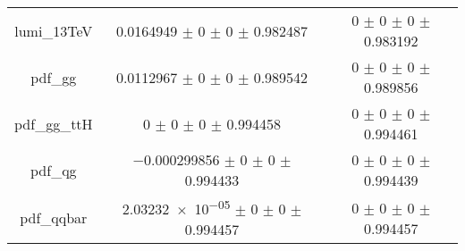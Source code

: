 \begin{table}
\begin{tabular}{ccc}
lumi\_13TeV & \num{0.0164949} $\pm$ \num{0} $\pm$ \num{0} $\pm$ \num{0.982487} & \num{0} $\pm$ \num{0} $\pm$ \num{0} $\pm$ \num{0.983192}\\
pdf\_gg & \num{0.0112967} $\pm$ \num{0} $\pm$ \num{0} $\pm$ \num{0.989542} & \num{0} $\pm$ \num{0} $\pm$ \num{0} $\pm$ \num{0.989856}\\
pdf\_gg\_ttH & \num{0} $\pm$ \num{0} $\pm$ \num{0} $\pm$ \num{0.994458} & \num{0} $\pm$ \num{0} $\pm$ \num{0} $\pm$ \num{0.994461}\\
pdf\_qg & \num{-0.000299856} $\pm$ \num{0} $\pm$ \num{0} $\pm$ \num{0.994433} & \num{0} $\pm$ \num{0} $\pm$ \num{0} $\pm$ \num{0.994439}\\
pdf\_qqbar & \num{2.03232e-05} $\pm$ \num{0} $\pm$ \num{0} $\pm$ \num{0.994457} & \num{0} $\pm$ \num{0} $\pm$ \num{0} $\pm$ \num{0.994457}\\
\bottomrule
\end{tabular}
\end{table}